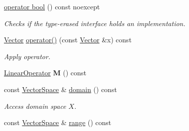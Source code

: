 \begin{DoxyCompactItemize}
\item 
\hyperlink{classSpacy_1_1DynamicOperator_a4d7243f9e135e01d4f87a0e21fe7cbe1}{operator bool} () const noexcept
\begin{DoxyCompactList}\small\item\em \-Checks if the type-\/erased interface holds an implementation. \end{DoxyCompactList}\item 
\hypertarget{classSpacy_1_1DynamicOperator_ace2c2202ca6eb3fe5f5817087d30510a}{\hyperlink{classSpacy_1_1Vector}{\-Vector} \hyperlink{classSpacy_1_1DynamicOperator_ace2c2202ca6eb3fe5f5817087d30510a}{operator()} (const \hyperlink{classSpacy_1_1Vector}{\-Vector} \&x) const }\label{classSpacy_1_1DynamicOperator_ace2c2202ca6eb3fe5f5817087d30510a}

\begin{DoxyCompactList}\small\item\em \-Apply operator. \end{DoxyCompactList}\item 
\hypertarget{classSpacy_1_1DynamicOperator_a38c8c5337fd79a98a7e64139d0cbed38}{\hyperlink{classSpacy_1_1LinearOperator}{\-Linear\-Operator} {\bfseries \-M} () const }\label{classSpacy_1_1DynamicOperator_a38c8c5337fd79a98a7e64139d0cbed38}

\item 
\hypertarget{classSpacy_1_1DynamicOperator_ad457cb5571c721f97530895aa26af626}{const \hyperlink{classSpacy_1_1VectorSpace}{\-Vector\-Space} \& \hyperlink{classSpacy_1_1DynamicOperator_ad457cb5571c721f97530895aa26af626}{domain} () const }\label{classSpacy_1_1DynamicOperator_ad457cb5571c721f97530895aa26af626}

\begin{DoxyCompactList}\small\item\em \-Access domain space $X$. \end{DoxyCompactList}\item 
\hypertarget{classSpacy_1_1DynamicOperator_ab760994d921fa8d9df2882f9e4cfc9c3}{const \hyperlink{classSpacy_1_1VectorSpace}{\-Vector\-Space} \& \hyperlink{classSpacy_1_1DynamicOperator_ab760994d921fa8d9df2882f9e4cfc9c3}{range} () const }\label{classSpacy_1_1DynamicOperator_ab760994d921fa8d9df2882f9e4cfc9c3}


\end{DoxyCompactItemize}
